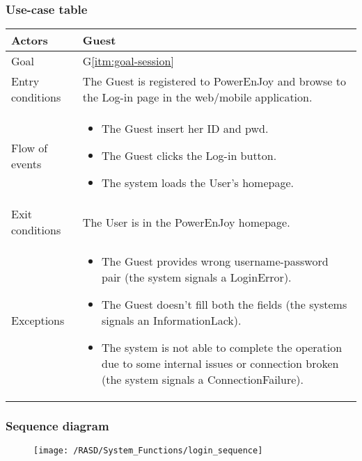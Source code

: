 \subsubsection{Use-case table}
\begin{center}
  \begin{tabular}{ l | p{10cm} }
    \hline
    Actors & Guest\\ \hline
    Goal & G\ref{itm:goal-session}\\ \hline
    Entry conditions & The Guest is registered to PowerEnJoy and browse to the Log-in page in the web/mobile application. \\ \hline
    Flow of events &
\begin{itemize}
\item The Guest insert her \gls{ID} and \gls{pwd}.
\item The Guest clicks the Log-in button.
\item The system loads the User's homepage.
\end{itemize} \\ \hline
    Exit conditions & The User is in the PowerEnJoy homepage. \\ \hline
  Exceptions & 
\begin{itemize}
\item The Guest provides wrong username-password pair (the system signals a LoginError).
\item The Guest doesn't fill both the fields (the systems signals an InformationLack).
\item The system is not able to complete the operation due to some internal issues or connection broken (the system signals a ConnectionFailure).%
\end{itemize} \\ \hline
  \end{tabular}
\end{center}


\subsubsection{Sequence diagram}
\begin{figure}[!ht]
  \centering
  \vspace{0.1cm}
  \texttt{[image: /RASD/System\_Functions/login\_sequence]}\\
  \vspace{0.1cm}
  \label{fig:login_sequence} 
\end{figure}


